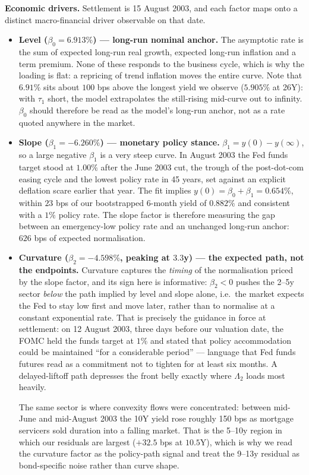 \documentclass[11pt]{article}
\begin{document}
 
\textbf{Economic drivers.} Settlement is 15 August 2003, and each factor maps onto a distinct
macro-financial driver observable on that date.
 
\begin{itemize}\itemsep3pt
  \item \textbf{Level ($\beta_0=6.913\%$) --- long-run nominal anchor.} The asymptotic rate is the
        sum of expected long-run real growth, expected long-run inflation and a term premium. None
        of these responds to the business cycle, which is why the loading is flat: a repricing of
        trend inflation moves the entire curve. Note that $6.91\%$ sits about $100$ bps above the
        longest yield we observe ($5.905\%$ at 26Y): with $\tau_1$ short, the model extrapolates
        the still-rising mid-curve out to infinity. $\beta_0$ should therefore be read as the
        model's long-run anchor, not as a rate quoted anywhere in the market.
  \item \textbf{Slope ($\beta_1=-6.260\%$) --- monetary policy stance.} $\beta_1=y(0)-y(\infty)$,
        so a large negative $\beta_1$ is a very steep curve. In August 2003 the Fed funds target
        stood at $1.00\%$ after the June 2003 cut, the trough of the post-dot-com easing cycle and
        the lowest policy rate in 45 years, set against an explicit deflation scare earlier that
        year. The fit implies $y(0)=\beta_0+\beta_1=0.654\%$, within $23$ bps of our bootstrapped
        6-month yield of $0.882\%$ and consistent with a $1\%$ policy rate. The slope factor is
        therefore measuring the gap between an emergency-low policy rate and an unchanged long-run
        anchor: $626$ bps of expected normalisation.
  \item \textbf{Curvature ($\beta_2=-4.598\%$, peaking at $3.3$y) --- the expected path, not the
        endpoints.} Curvature captures the \emph{timing} of the normalisation priced by the slope
        factor, and its sign here is informative: $\beta_2<0$ pushes the 2--5y sector \emph{below}
        the path implied by level and slope alone, i.e.\ the market expects the Fed to stay low
        first and move later, rather than to normalise at a constant exponential rate. That is
        precisely the guidance in force at settlement: on 12 August 2003, three days before our
        valuation date, the FOMC held the funds target at $1\%$ and stated that policy
        accommodation could be maintained ``for a considerable period'' --- language that Fed funds
        futures read as a commitment not to tighten for at least six months. A delayed-liftoff path
        depresses the front belly exactly where $\Lambda_2$ loads most heavily.
 
        The same sector is where convexity flows were concentrated: between mid-June and mid-August
        2003 the 10Y yield rose roughly 150 bps as mortgage servicers sold duration into a falling
        market. That is the 5--10y region in which our residuals are largest ($+32.5$ bps at
        $10.5$Y), which is why we read the curvature factor as the policy-path signal and treat the
        9--13y residual as bond-specific noise rather than curve shape.
\end{itemize}
 
\end{document}
